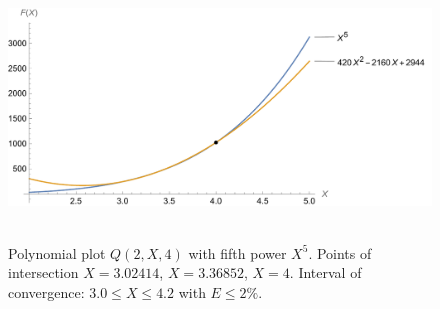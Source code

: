 ﻿\begin{figure}[H]
    \centering
    \includegraphics[width=1\textwidth]{sections/images/04_plots_polynomial_q2_n4_with_fifth}
    ~\caption{Polynomial plot $Q(2, X, 4)$ with fifth power $X^5$.
    Points of intersection $X=3.02414$, $X=3.36852$, $X=4$.
    Interval of convergence: $3.0 \leq X \leq 4.2$ with $E\leq 2\%$.
    }\label{fig:figure10}
\end{figure}
